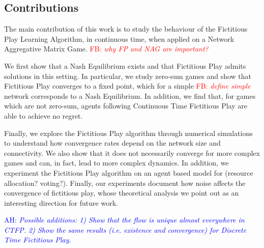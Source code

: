 \documentclass{article}
\theoremstyle{definition}
\newcommand{\ah}[1]{\textcolor{blue}{AH: \textit{#1}}}
\newcommand{\fb}[1]{\textcolor{red}{FB: \textit{#1}}}
\begin{document}
		\subsection{Contributions}

		The main contribution of this work is to study the
                behaviour of the Fictitious Play Learning Algorithm,
                in continuous time, when applied on a Network
                Aggregative Matrix Game.
\fb{why FP and NAG are important?}


                We first show that a Nash
                Equilibrium exists and that Fictitious Play admits
                solutions in this setting. In particular, we study
                zero-sum games and show that Fictitious Play converges
                to a fixed point, which for a simple \fb{define simple} network
                corresponds to a Nash Equilibrium. In addition, we
                find that, for games which are not zero-sum, agents
                following Continuous Time Fictitious Play are able to
                achieve no regret.

		Finally, we explore the Fictitious Play algorithm
                through numerical simulations to understand how
                convergence rates depend on the network size and
                connectivity. We also show that it does not
                necessarily converge for more complex games and can,
                in fact, lead to more complex dynamics. In addition,
                we experiment the Fictitious Play algorithm on an
                agent based model for (resource allocation?
                voting?). Finally, our experiments document how noise
                affects the convergence of fictitious play, whose
                theoretical analysis we point out as an interesting
                direction for future work.

		\ah{Possible additions: 1) Show that the flow is
                  unique almost everywhere in CTFP. 2) Show the same
                  results (i.e. existence and convergence) for
                  Discrete Time Fictitious Play.}
\end{document}
